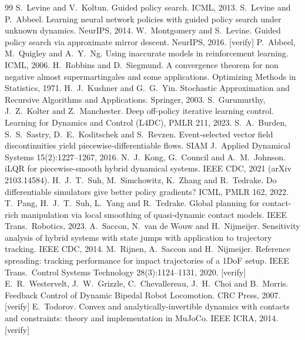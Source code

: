 \documentclass[11pt]{article}
\theoremstyle{definition}
\theoremstyle{remark}
\begin{document}
\begin{thebibliography}{99}
 S.~Levine and V.~Koltun. Guided policy search. ICML, 2013.
 S.~Levine and P.~Abbeel. Learning neural network policies with guided policy search under
unknown dynamics. NeurIPS, 2014.
 W.~Montgomery and S.~Levine. Guided policy search via approximate mirror descent.
NeurIPS, 2016. [verify]
 P.~Abbeel, M.~Quigley and A.~Y.~Ng. Using inaccurate models in reinforcement learning.
ICML, 2006.
 H.~Robbins and D.~Siegmund. A convergence theorem for non negative almost supermartingales and
some applications. Optimizing Methods in Statistics, 1971.
 H.~J.~Kushner and G.~G.~Yin. Stochastic Approximation and Recursive Algorithms and Applications.
Springer, 2003.
 S.~Gurumurthy, J.~Z.~Kolter and Z.~Manchester. Deep off-policy iterative learning
control. Learning for Dynamics and Control (L4DC), PMLR 211, 2023.
 S.~A.~Burden, S.~S.~Sastry, D.~E.~Koditschek and S.~Revzen. Event-selected vector field
discontinuities yield piecewise-differentiable flows. SIAM J.\ Applied Dynamical Systems 15(2):1227--1267, 2016.
 N.~J.~Kong, G.~Council and A.~M.~Johnson. iLQR for piecewise-smooth hybrid dynamical systems.
IEEE CDC, 2021 (arXiv 2103.14584).
 H.~J.~T.~Suh, M.~Simchowitz, K.~Zhang and R.~Tedrake. Do differentiable simulators give better policy
gradients? ICML, PMLR 162, 2022.
 T.~Pang, H.~J.~T.~Suh, L.~Yang and R.~Tedrake. Global planning for contact-rich manipulation via
local smoothing of quasi-dynamic contact models. IEEE Trans.\ Robotics, 2023.
 A.~Saccon, N.~van de Wouw and H.~Nijmeijer. Sensitivity analysis of hybrid systems with
state jumps with application to trajectory tracking. IEEE CDC, 2014.
 M.~Rijnen, A.~Saccon and H.~Nijmeijer. Reference spreading: tracking performance for
impact trajectories of a 1DoF setup. IEEE Trans.\ Control Systems Technology 28(3):1124--1131, 2020. [verify]
 E.~R.~Westervelt, J.~W.~Grizzle, C.~Chevallereau, J.~H.~Choi and B.~Morris. Feedback
Control of Dynamic Bipedal Robot Locomotion. CRC Press, 2007. [verify]
 E.~Todorov. Convex and analytically-invertible dynamics with contacts and constraints:
theory and implementation in MuJoCo. IEEE ICRA, 2014. [verify]
\end{thebibliography}
\end{document}
